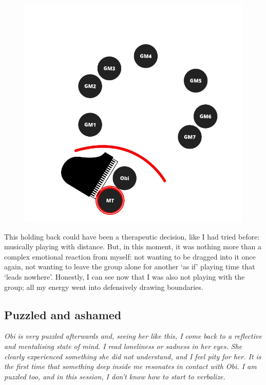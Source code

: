 \documentclass[authordate, empirical, issue]{jote-new-article}
\begin{document}
\begin{figure}


  \includegraphics[width=\linewidth]{media/image2.png}

  \caption{}

  \label{fig:rId6}


\end{figure}



This holding back could have been a therapeutic decision, like I had tried before: musically playing with distance. But, in this moment, it was nothing more than a complex emotional reaction from myself: not wanting to be dragged into it once again, not wanting to leave the group alone for another ‘as if' playing time that ‘leads nowhere'. Honestly, I can see now that I was also not playing with the group; all my energy went into defensively drawing boundaries.







\subsection{Puzzled and ashamed}



{\emph{Obi is very puzzled afterwards and, seeing her like this, I come back to a reflective and mentalising state of mind. I read loneliness or sadness in her eyes. She clearly experienced something she did not understand, and I feel pity for her. It is the first time that something deep inside me resonates in contact with Obi. I am puzzled too, and in this session, I don't know how to start to verbalize.}}
\end{document}
